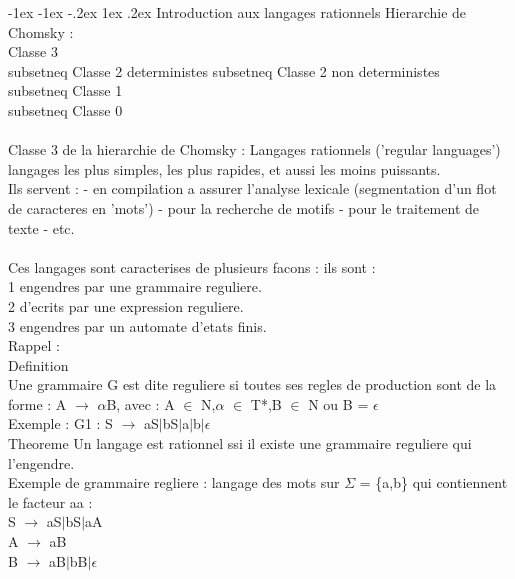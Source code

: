 \documentclass[5pt]{article}
\makeatletter
\renewcommand{\subsubsection}{\@startsection {section}{1}{\z@}%
             {-1ex \@plus -1ex \@minus -.2ex}%
             {1ex \@plus.2ex}%
             {\normalfont\scriptsize\sffamily\bfseries}}
\makeatother
\begin{document}
\begin{scriptsize}
\subsubsection{Introduction aux langages rationnels}
Hierarchie de Chomsky :\\
Classe 3\\
subsetneq Classe 2 deterministes subsetneq Classe 2 non deterministes \\
subsetneq Classe 1\\
subsetneq Classe 0\\
\\
Classe 3 de la hierarchie de Chomsky : Langages rationnels (’regular languages’)\\
langages les plus simples, les plus rapides, et aussi les moins puissants.\\
Ils servent : - en compilation a assurer l'analyse lexicale (segmentation d’un flot de caracteres en ’mots’) - pour la recherche de motifs - pour le traitement de texte - etc.\\
\\
Ces langages sont caracterises de plusieurs facons : ils sont :\\
1 engendres par une grammaire reguliere.\\
2 d'ecrits par une expression reguliere.\\
3 engendres par un automate d'etats finis.
\\
Rappel :\\
Definition\\
Une grammaire G est dite reguliere si toutes ses regles de production sont de la forme : A $\rightarrow$ $\alpha$B, avec : A $\in$ N,$\alpha$ $\in$ T*,B $\in$ N ou B = $\epsilon$
\\
Exemple : G1 : S $\rightarrow$  aS$\mid$bS$\mid$a$\mid$b$\mid\epsilon$
\\
Theoreme Un langage est rationnel ssi il existe une grammaire reguliere qui l’engendre.
\\
Exemple de grammaire regliere :
langage des mots sur $\Sigma$ = \{a,b\} qui contiennent le facteur aa :\\
S $\rightarrow$ aS$\mid$bS$\mid$aA\\
A $\rightarrow$ aB\\
B $\rightarrow$ aB$\mid$bB$\mid\epsilon$

\end{scriptsize}
\end{document}
